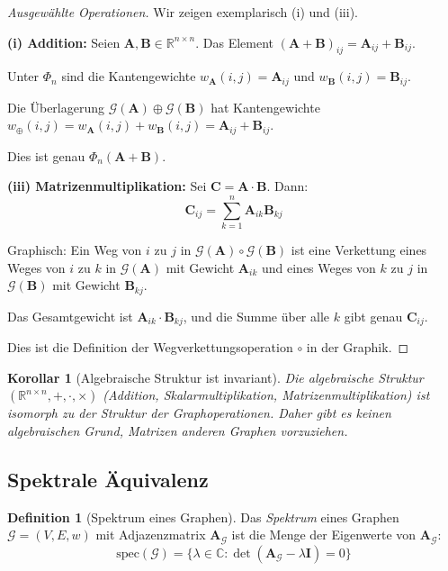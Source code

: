 \documentclass[12pt, a4paper]{article}
\newtheorem{corollary}[theorem]{Korollar}
\theoremstyle{definition}
\newtheorem{definition}[theorem]{Definition}
\theoremstyle{remark}
\newcommand{\R}{\mathbb{R}}
\newcommand{\C}{\mathbb{C}}
\newcommand{\vA}{\bm{A}}
\newcommand{\vB}{\bm{B}}
\newcommand{\vC}{\bm{C}}
\newcommand{\vI}{\bm{I}}
\newcommand{\Graph}{\mathcal{G}}
\begin{document}
\begin{proof}[Ausgewählte Operationen]
Wir zeigen exemplarisch (i) und (iii).

\textbf{(i) Addition:} Seien $\vA, \vB \in \R^{n \times n}$. Das Element $(\vA + \vB)_{ij} = \vA_{ij} + \vB_{ij}$.

Unter $\Phi_n$ sind die Kantengewichte $w_{\vA}(i,j) = \vA_{ij}$ und $w_{\vB}(i,j) = \vB_{ij}$.

Die Überlagerung $\Graph(\vA) \oplus \Graph(\vB)$ hat Kantengewichte $w_{\oplus}(i,j) = w_{\vA}(i,j) + w_{\vB}(i,j) = \vA_{ij} + \vB_{ij}$.

Dies ist genau $\Phi_n(\vA + \vB)$.

\textbf{(iii) Matrizenmultiplikation:} Sei $\vC = \vA \cdot \vB$. Dann:
\[
  \vC_{ij} = \sum_{k=1}^{n} \vA_{ik} \vB_{kj}
\]

Graphisch: Ein Weg von $i$ zu $j$ in $\Graph(\vA) \circ \Graph(\vB)$ ist eine Verkettung eines Weges von $i$ zu $k$ in $\Graph(\vA)$ mit Gewicht $\vA_{ik}$ und eines Weges von $k$ zu $j$ in $\Graph(\vB)$ mit Gewicht $\vB_{kj}$.

Das Gesamtgewicht ist $\vA_{ik} \cdot \vB_{kj}$, und die Summe über alle $k$ gibt genau $\vC_{ij}$.

Dies ist die Definition der Wegverkettungsoperation $\circ$ in der Graphik.
\end{proof}

\begin{corollary}[Algebraische Struktur ist invariant]
\label{cor:struktur_invariant}
Die algebraische Struktur $(\R^{n \times n}, +, \cdot, \times)$ (Addition, Skalarmultiplikation, Matrizenmultiplikation) ist isomorph zu der Struktur der Graphoperationen. Daher gibt es keinen algebraischen Grund, Matrizen anderen Graphen vorzuziehen.
\end{corollary}

\subsection{Spektrale Äquivalenz}
\label{subsec:spektrale_aequivalenz}

\begin{definition}[Spektrum eines Graphen]
\label{def:spektrum_graph}
Das \emph{Spektrum} eines Graphen $\Graph = (V, E, w)$ mit Adjazenzmatrix $\vA_{\Graph}$ ist die Menge der Eigenwerte von $\vA_{\Graph}$:
\[
  \mathrm{spec}(\Graph) = \{\lambda \in \C : \det(\vA_{\Graph} - \lambda \vI) = 0\}
\]
\end{definition}
\end{document}
